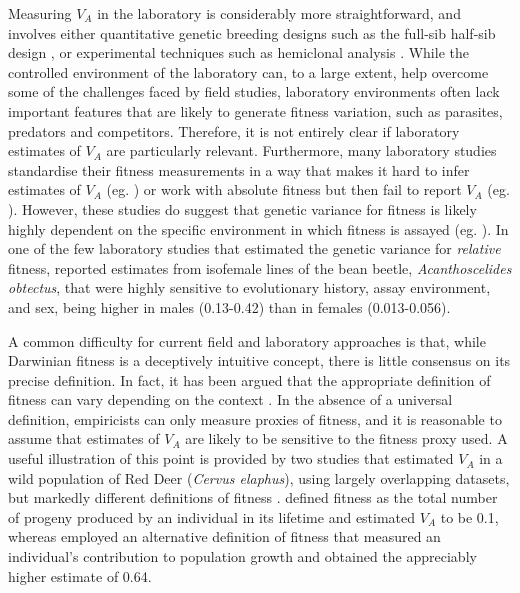 \documentclass[12pt]{article}
\begin{document}
\begin{bibunit}
Measuring $V_A$ in the laboratory is considerably more straightforward, and involves either quantitative genetic breeding designs such as the full-sib half-sib design \citep{falconer1996,lynch1998}, or experimental techniques such as hemiclonal analysis \citep{abbott2011obtaining}. While the controlled environment of the laboratory can, to a large extent, help overcome some of the challenges faced by field studies, laboratory environments often lack important features that are likely to generate fitness variation, such as parasites, predators and competitors. Therefore, it is not entirely clear if laboratory estimates of $V_A$ are particularly relevant. Furthermore, many laboratory studies standardise their fitness measurements in a way that makes it hard to infer estimates of $V_A$ (eg. \citet{ruzicka2019genome})  or work with absolute fitness but then fail to report $V_A$ (eg. \citet{singh2023investigation}). However, these studies do suggest that genetic variance for fitness is likely highly dependent on the specific environment in which fitness is assayed (eg. \citet{punzalan2014comparing}). In one of the few laboratory studies that estimated the genetic variance for \emph{relative} fitness,  \citet{martinossi2018consequences} reported estimates from isofemale lines of the bean beetle, \emph{Acanthoscelides obtectus}, that were highly sensitive to evolutionary history, assay environment, and sex, being higher in males (0.13-0.42) than in females (0.013-0.056).  

A common difficulty for current field and laboratory approaches is that, while Darwinian fitness is a deceptively intuitive concept, there is little consensus on its precise definition. In fact, it has been argued that the appropriate definition of fitness can vary depending on the context \citep{hendry2018contemporary}. In the absence of a universal definition, empiricists can only measure proxies of fitness, and it is reasonable to assume that estimates of $V_A$ are likely to be sensitive to the fitness proxy used. A useful illustration of this point is provided by two studies that estimated $V_A$ in a wild population of Red Deer (\emph{Cervus elaphus}), using largely overlapping datasets, but markedly different definitions of fitness \citep{kruuk2000heritability, foerster2007sexually}. \citet{kruuk2000heritability} defined fitness as the total number of progeny produced by an individual in its lifetime and estimated $V_A$ to be 0.1, whereas \cite{foerster2007sexually} employed an alternative definition of fitness that measured an individual’s contribution to population growth \citep{coulson2006estimating} and obtained the appreciably higher estimate of 0.64. 


\end{bibunit}
\end{document}

